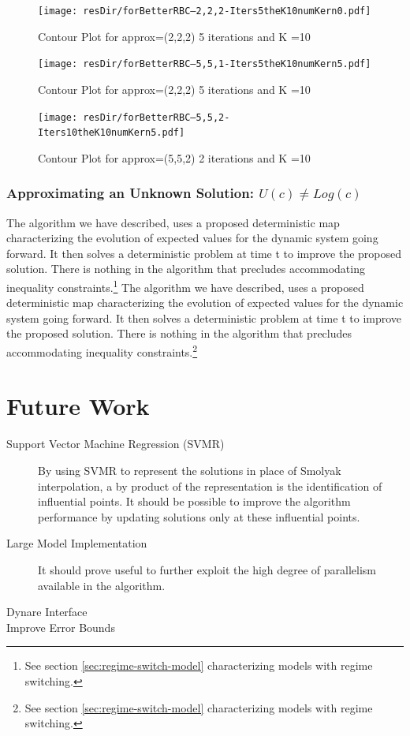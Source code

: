 \documentclass[12pt]{article}
\begin{document}
\begin{figure}
  \centering
\iflinux
  \texttt{[image: resDir/forBetterRBC--2,2,2-Iters5theK10numKern0.pdf]}
\fi
  \caption{Contour Plot for approx=(2,2,2) 5 iterations and K =10}
  \label{fig:cntplt}
\end{figure}

\begin{figure}
  \centering
\iflinux
  \texttt{[image: resDir/forBetterRBC--5,5,1-Iters5theK10numKern5.pdf]}
\fi
  \caption{Contour Plot for approx=(2,2,2) 5 iterations and K =10}
  \label{fig:cntplt}
\end{figure}

\begin{figure}
  \centering
\iflinux
  \texttt{[image: resDir/forBetterRBC--5,5,2-Iters10theK10numKern5.pdf]}
  \fi
  \caption{Contour Plot for approx=(5,5,2) 2 iterations and K =10}
  \label{fig:cntplt}
\end{figure}
\subsubsection{Approximating an Unknown Solution: $U(c) \ne Log(c)$ }
\label{sec:unknown-solutions}

The algorithm we have described,
uses a proposed deterministic map
characterizing the evolution of expected values for
the dynamic system going forward. It then solves
a deterministic problem at time t to improve the proposed solution.
There is nothing in the algorithm that precludes accommodating  inequality
constraints.\footnote{See section \ref{sec:regime-switch-model} characterizing
  models with regime switching.} 
The algorithm we have described,
uses a proposed deterministic map
characterizing the evolution of expected values for
the dynamic system going forward. It then solves
a deterministic problem at time t to improve the proposed solution.
There is nothing in the algorithm that precludes accommodating  inequality
constraints.\footnote{See section \ref{sec:regime-switch-model} characterizing
  models with regime switching.}


\section{Future Work}
\label{sec:future}

\begin{description}
\item[Support Vector Machine Regression (SVMR)] By using SVMR to represent the solutions in place of Smolyak interpolation, a by product of the representation is the identification of influential points.  It should be possible to improve the algorithm performance by updating solutions only at these influential points.
\item[Large Model Implementation] It should prove useful to further exploit 
the high degree of parallelism available in the algorithm.
\item[Dynare Interface] 
\item[Improve Error Bounds] 
\end{description}
\end{document}

